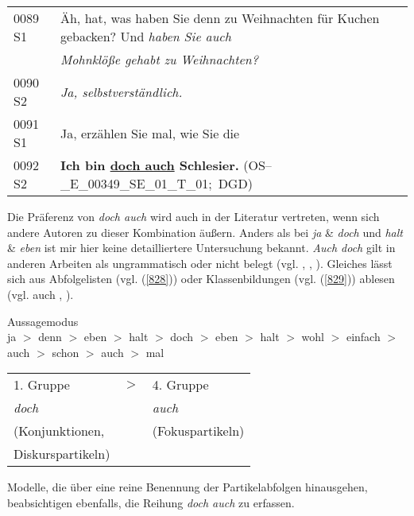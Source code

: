 \begin{exe}
	\ex\label{827} 
	\scriptsize
    \begin{tabular}[t]{ll}
	0089 S1 & Äh, hat, was haben Sie denn zu Weihnachten für Kuchen gebacken? Und \emph{haben Sie auch}\\
 	& \emph{Mohnklöße gehabt zu Weihnachten?}\\
	0090 S2 & \emph{Ja, selbstverständlich.}\\
	0091 S1	& Ja, erzählen Sie mal, wie Sie die\\
	0092 S2 & \textbf{Ich bin \underline{doch auch} Schlesier.}			
	\hfill\hbox{(OS--\_E\_00349\_SE\_01\_T\_01; DGD)}	 
    \end{tabular}       
\end{exe}	
Die Präferenz von \textit{doch auch} wird auch in der Literatur vertreten, wenn sich andere Autoren zu dieser Kombination äußern. Anders als bei \textit{ja} \& \textit{doch} und \textit{halt} \& \textit{eben} ist mir hier keine detaillier\-tere Untersuchung bekannt. \textit{Auch doch} gilt in anderen Arbeiten als ungrammatisch oder nicht belegt (vgl. \citealt[227, 230]{Dahl1988}, \citealt[356]{Lemnitzer2001}, \citealt[196]{Kwon2005}). Gleiches lässt sich aus Abfolgelisten (vgl. (\ref{828})) oder Klassenbildungen (vgl. (\ref{829})) ablesen (vgl. auch \citealt[91-94]{Engel1968}, \citealt[42]{Helbig1981}).

\begin{exe}
	\ex\label{828}Aussagemodus\\
	\scriptsize
	ja $>$ denn $>$ eben $>$ halt $>$ doch $>$ eben $>$ halt $>$ wohl $>$ einfach $>$ auch $>$ schon $>$ auch $>$ mal\\
	\newline
	\hbox{}\hfill\hbox{\citet[908, 1542]{Zifonun1997}}
\end{exe}
\vspace{-0.5cm}
\begin{exe}
	\ex\label{829} 
    \begin{tabular}[t]{lll}
	1. Gruppe & $>$ & 4. Gruppe\\
	\textit{doch} & {} & \textit{auch}\\
	(Konjunktionen, & {} & (Fokuspartikeln)\\
	Diskurspartikeln) & &			 
    \end{tabular}   
    \newline
	\hbox{}\hfill\hbox{\citet[31]{Thurmair1991}}   
\end{exe}
	
Modelle, die über eine reine Benennung der Partikelabfolgen hinausgehen, beabsichtigen ebenfalls, die Reihung \textit{doch auch} zu erfassen. 


